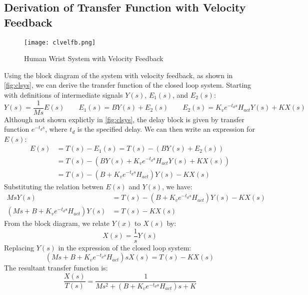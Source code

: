 \documentclass[11pt,a4paper]{article}
\begin{document}
\subsection{Derivation of Transfer Function with Velocity Feedback}
\begin{figure}
    \centering
    \texttt{[image: clvelfb.png]}
    \caption{Human Wrist System with Velocity Feedback}
    \label{fig:clsys}
\end{figure}
Using the block diagram of the system with velocity feedback, as shown in
\autoref{fig:clsys}, we can derive the transfer function of the closed loop
system. Starting with definitions of intermediate signals $Y(s)$, $E_1(s)$, and
$E_2(s)$:
\begin{equation*}
    Y(s) = \frac{1}{Ms}E(s) \qquad E_1(s) = BY(s) + E_2(s) \qquad
    E_2(s) = K_v e^{-t_d s} H_{act} Y(s) + KX(s)
\end{equation*}
Although not shown explictly in \autoref{fig:clsys}, the delay block is given
by transfer function $ e^{-t_d s} $, where $t_d$ is the specified delay. We can
then write an expression for $E(s)$:
\begin{align*}
    E(s) &= T(s) - E_1(s) = T(s) - (BY(s) + E_2(s)) \\
         &= T(s) - (BY(s) + K_v e^{-t_d s} H_{act} Y(s) + KX(s)) \\
         &= T(s) - (B + K_v e^{-t_d s} H_{act}) Y(s) - KX(s)
\end{align*}
Substituting the relation betwen $E(s)$ and $Y(s)$, we have:
\begin{align*}
    Ms Y(s) &= T(s) - (B + K_v e^{-t_d s} H_{act}) Y(s) - KX(s) \\
    (Ms + B + K_v e^{-t_d s} H_{act}) Y(s) &= T(s) - KX(s)
\end{align*}
From the block diagram, we relate $Y(x)$ to $X(s)$ by:
\begin{equation*}
    X(s) = \frac{1}{s} Y(s)
\end{equation*}
Replacing $Y(s)$ in the expression of the closed loop system:
\begin{equation*}
    (Ms + B + K_v e^{-t_d s} H_{act}) s X(s) = T(s) - KX(s)
\end{equation*}
The resultant transfer function is:
\begin{equation*}
    \frac{X(s)}{T(s)} = \frac{1}{Ms^2 + (B + K_v e^{-t_d s} H_{act}) s  + K}
\end{equation*}

\end{document}
